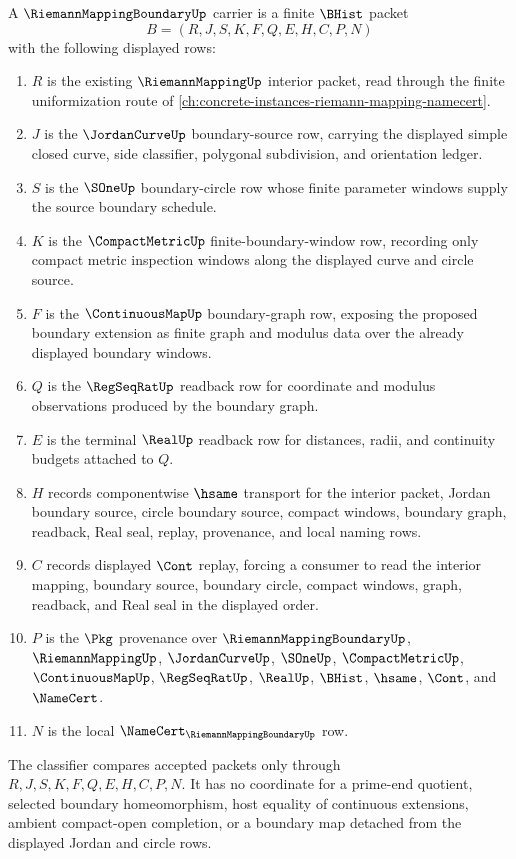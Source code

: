 \begin{definition}
\label{def:riemann-mapping-boundary-carrier}
A $\RiemannMappingBoundaryUp$ carrier is a finite $\BHist$ packet
$$
B=(R,J,S,K,F,Q,E,H,C,P,N)
$$
with the following displayed rows:
\begin{enumerate}
\item $R$ is the existing $\RiemannMappingUp$ interior packet, read through the finite uniformization route of \autoref{ch:concrete-instances-riemann-mapping-namecert}.
\item $J$ is the $\JordanCurveUp$ boundary-source row, carrying the displayed simple closed curve, side classifier, polygonal subdivision, and orientation ledger.
\item $S$ is the $\SOneUp$ boundary-circle row whose finite parameter windows supply the source boundary schedule.
\item $K$ is the $\CompactMetricUp$ finite-boundary-window row, recording only compact metric inspection windows along the displayed curve and circle source.
\item $F$ is the $\ContinuousMapUp$ boundary-graph row, exposing the proposed boundary extension as finite graph and modulus data over the already displayed boundary windows.
\item $Q$ is the $\RegSeqRatUp$ readback row for coordinate and modulus observations produced by the boundary graph.
\item $E$ is the terminal $\RealUp$ readback row for distances, radii, and continuity budgets attached to $Q$.
\item $H$ records componentwise $\hsame$ transport for the interior packet, Jordan boundary source, circle boundary source, compact windows, boundary graph, readback, Real seal, replay, provenance, and local naming rows.
\item $C$ records displayed $\Cont$ replay, forcing a consumer to read the interior mapping, boundary source, boundary circle, compact windows, graph, readback, and Real seal in the displayed order.
\item $P$ is the $\Pkg$ provenance over $\RiemannMappingBoundaryUp$, $\RiemannMappingUp$, $\JordanCurveUp$, $\SOneUp$, $\CompactMetricUp$, $\ContinuousMapUp$, $\RegSeqRatUp$, $\RealUp$, $\BHist$, $\hsame$, $\Cont$, and $\NameCert$.
\item $N$ is the local $\NameCert_{\RiemannMappingBoundaryUp}$ row.
\end{enumerate}
The classifier compares accepted packets only through $R,J,S,K,F,Q,E,H,C,P,N$. It has no coordinate for a prime-end quotient, selected boundary homeomorphism, host equality of continuous extensions, ambient compact-open completion, or a boundary map detached from the displayed Jordan and circle rows.
\end{definition}

